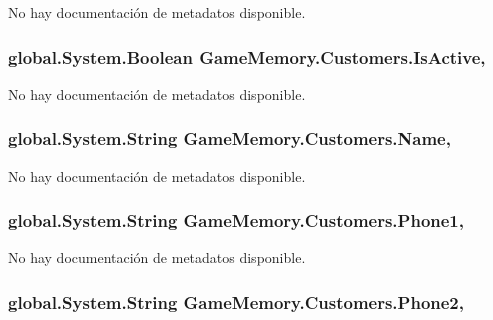 No hay documentación de metadatos disponible. 

\hypertarget{class_game_memory_1_1_customers_a24e171b530ecc8d281c609bb105e993f}{
\subsubsection[{Is\-Active}]{\setlength{\rightskip}{0pt plus 5cm}global.\-System.\-Boolean Game\-Memory.\-Customers.\-Is\-Active\hspace{0.3cm}{\ttfamily [get]}, {\ttfamily [set]}}}\label{class_game_memory_1_1_customers_a24e171b530ecc8d281c609bb105e993f}


No hay documentación de metadatos disponible. 

\hypertarget{class_game_memory_1_1_customers_a12723ccfb832e49e423f8c03b61c5426}{
\subsubsection[{Name}]{\setlength{\rightskip}{0pt plus 5cm}global.\-System.\-String Game\-Memory.\-Customers.\-Name\hspace{0.3cm}{\ttfamily [get]}, {\ttfamily [set]}}}\label{class_game_memory_1_1_customers_a12723ccfb832e49e423f8c03b61c5426}


No hay documentación de metadatos disponible. 

\hypertarget{class_game_memory_1_1_customers_a0294fbd74c2ccc7636391ecde3a502a1}{
\subsubsection[{Phone1}]{\setlength{\rightskip}{0pt plus 5cm}global.\-System.\-String Game\-Memory.\-Customers.\-Phone1\hspace{0.3cm}{\ttfamily [get]}, {\ttfamily [set]}}}\label{class_game_memory_1_1_customers_a0294fbd74c2ccc7636391ecde3a502a1}


No hay documentación de metadatos disponible. 

\hypertarget{class_game_memory_1_1_customers_a6ca17ada64734ee4d301d5bc701ca213}{
\subsubsection[{Phone2}]{\setlength{\rightskip}{0pt plus 5cm}global.\-System.\-String Game\-Memory.\-Customers.\-Phone2\hspace{0.3cm}{\ttfamily [get]}, {\ttfamily [set]}}}\label{class_game_memory_1_1_customers_a6ca17ada64734ee4d301d5bc701ca213}


